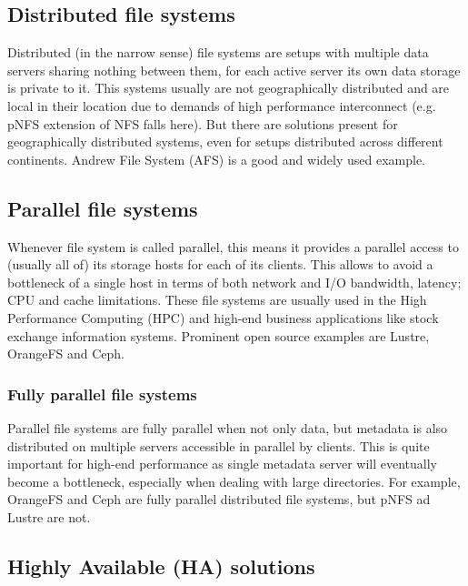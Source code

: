 \documentclass[10pt, a5paper]{article}
\begin{document}
{\subsection*{Distributed file systems}

Distributed (in the narrow sense) file systems are setups with multiple data servers sharing nothing between them, for each active server its own data storage is private to it. This systems usually are not geographically distributed and are local in their location due to demands of high performance interconnect (e.g. pNFS\cite{bib3} extension of NFS\cite{bib2} falls here). But there are solutions present for geographically distributed systems, even for setups distributed across different continents. Andrew File System (AFS\cite{bib8}) is a good and widely used example.

\subsection*{Parallel file systems}

Whenever file system is called parallel, this means it provides a parallel access to (usually all of) its storage hosts for each of its clients. This allows to avoid a bottleneck of a single host in terms of both network and I/O bandwidth, latency; CPU and cache limitations. These file systems are usually used in the High Performance Computing (HPC\cite{bib2}\cite{bib9}) and high-end business applications like stock exchange information systems. Prominent open source examples are Lustre\cite{bib10}, OrangeFS\cite{bib11} and Ceph\cite{bib12}.

\subsubsection*{Fully parallel file systems}

Parallel file systems are fully parallel when not only data, but metadata is also distributed on multiple servers accessible in parallel by clients. This is quite important for high-end performance as single metadata server will eventually become a bottleneck, especially when dealing with large directories. For example, OrangeFS\cite{bib11} and Ceph\cite{bib12} are fully parallel distributed file systems, but pNFS\cite{bib4} ad Lustre\cite{bib10} are not.

\subsection*{Highly Available (HA) solutions}

}
\end{document}
